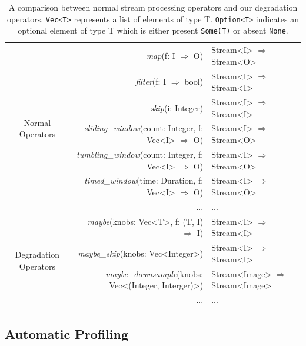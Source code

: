 \begin{table}
  \centering
  \begin{tabular}{ c r l }
    \toprule
    \multirow{7}{*}{Normal Operators}
    & \textit{map}(f: I $\Rightarrow$ O) & Stream<I> $\Rightarrow$ Stream<O> \\
    & \textit{filter}(f: I $\Rightarrow$ bool) & Stream<I> $\Rightarrow$
                                                 Stream<I> \\
    & \textit{skip}(i: Integer) & Stream<I> $\Rightarrow$ Stream<I> \\
    & \textit{sliding\_window}(count: Integer, f: Vec<I> $\Rightarrow$ O) & Stream<I> $\Rightarrow$
                                                                            Stream<O> \\
    & \textit{tumbling\_window}(count: Integer, f: Vec<I> $\Rightarrow$ O) & Stream<I> $\Rightarrow$
                                                                             Stream<O> \\
    & \textit{timed\_window}(time: Duration, f: Vec<I> $\Rightarrow$ O) & Stream<I> $\Rightarrow$
                                                                          Stream<O> \\
    & ... & ... \\
    \midrule
    \multirow{4}{*}{Degradation Operators}
    & \textit{maybe}(knobs: Vec<T>, f: (T, I) $\Rightarrow$ I) & Stream<I> $\Rightarrow$
                                                                 Stream<I> \\
    & \textit{maybe\_skip}(knobs: Vec<Integer>) & Stream<I> $\Rightarrow$ Stream<I> \\
    & \textit{maybe\_downsample}(knobs: Vec<(Integer, Interger)>) & Stream<Image> $\Rightarrow$ Stream<Image> \\
    & ... & ... \\
    \bottomrule
  \end{tabular}
  \caption{A comparison between normal stream processing operators and our
    degradation operators. \texttt{Vec<T>} represents a list of elements of type
    T. \texttt{Option<T>} indicates an optional element of type T which is
    either present \texttt{Some(T)} or absent \texttt{None}.}
  \label{tab:operators}
\end{table}

\subsection{Automatic Profiling}
\label{sec:automatic-profiling}


